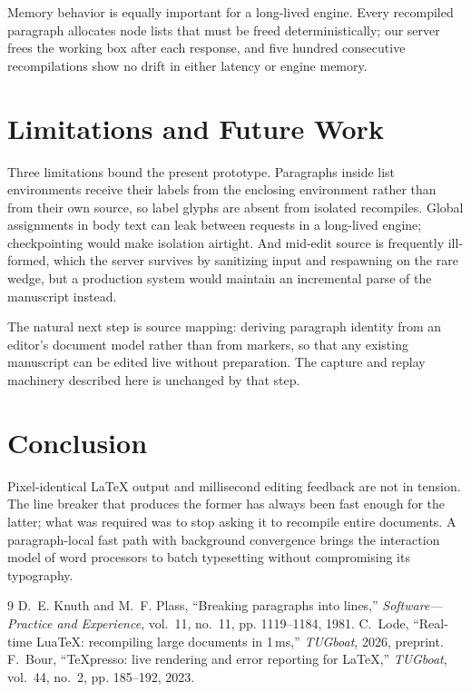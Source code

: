 \documentclass[journal]{IEEEtran}
\begin{document}
\tagStructPara{}Memory behavior is equally important for a long-lived engine. Every
recompiled paragraph allocates node lists that must be freed
deterministically; our server frees the working box after each response,
and five hundred consecutive recompilations show no drift in either
latency or engine memory.\tagStructParaEnd{}%

\section{Limitations and Future Work}

\tagStructPara{}Three limitations bound the present prototype. Paragraphs inside list
environments receive their labels from the enclosing environment rather
than from their own source, so label glyphs are absent from isolated
recompiles. Global assignments in body text can leak between requests in a
long-lived engine; checkpointing would make isolation airtight. And
mid-edit source is frequently ill-formed, which the server survives by
sanitizing input and respawning on the rare wedge, but a production system
would maintain an incremental parse of the manuscript instead.\tagStructParaEnd{}%

\tagStructPara{}The natural next step is source mapping: deriving paragraph identity from
an editor's document model rather than from markers, so that any existing
manuscript can be edited live without preparation. The capture and replay
machinery described here is unchanged by that step.\tagStructParaEnd{}%

\section{Conclusion}

\tagStructPara{}Pixel-identical \LaTeX{} output and millisecond editing feedback are not
in tension. The line breaker that produces the former has always been fast
enough for the latter; what was required was to stop asking it to
recompile entire documents. A paragraph-local fast path with background
convergence brings the interaction model of word processors to batch
typesetting without compromising its typography.\tagStructParaEnd{}%

\begin{thebibliography}{9}
 D.~E. Knuth and M.~F. Plass, ``Breaking paragraphs
into lines,'' \emph{Software---Practice and Experience}, vol.~11, no.~11,
pp. 1119--1184, 1981.
 C.~Lode, ``Real-time Lua\TeX: recompiling large documents
in 1\,ms,'' \emph{TUGboat}, 2026, preprint.
 F.~Bour, ``TeXpresso: live rendering and error reporting
for \LaTeX,'' \emph{TUGboat}, vol.~44, no.~2, pp. 185--192, 2023.
\end{thebibliography}
\end{document}
